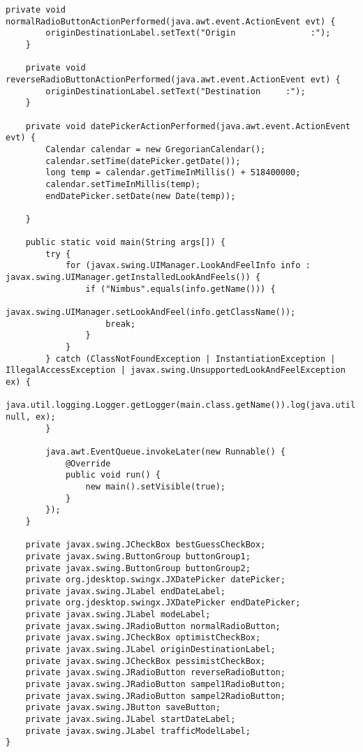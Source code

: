 \begin{lstlisting}[caption= main.java]
    private void normalRadioButtonActionPerformed(java.awt.event.ActionEvent evt) {                                                  
        originDestinationLabel.setText("Origin               :");
    }                                                 

    private void reverseRadioButtonActionPerformed(java.awt.event.ActionEvent evt) {                                                   
        originDestinationLabel.setText("Destination     :");
    }                                                  

    private void datePickerActionPerformed(java.awt.event.ActionEvent evt) {                                           
        Calendar calendar = new GregorianCalendar();
        calendar.setTime(datePicker.getDate());
        long temp = calendar.getTimeInMillis() + 518400000;
        calendar.setTimeInMillis(temp);
        endDatePicker.setDate(new Date(temp));
        
    }                                          

    public static void main(String args[]) {
        try {
            for (javax.swing.UIManager.LookAndFeelInfo info : javax.swing.UIManager.getInstalledLookAndFeels()) {
                if ("Nimbus".equals(info.getName())) {
                    javax.swing.UIManager.setLookAndFeel(info.getClassName());
                    break;
                }
            }
        } catch (ClassNotFoundException | InstantiationException | IllegalAccessException | javax.swing.UnsupportedLookAndFeelException ex) {
            java.util.logging.Logger.getLogger(main.class.getName()).log(java.util.logging.Level.SEVERE, null, ex);
        }
        
        java.awt.EventQueue.invokeLater(new Runnable() {
            @Override
            public void run() {
                new main().setVisible(true);
            }
        });
    }
                    
    private javax.swing.JCheckBox bestGuessCheckBox;
    private javax.swing.ButtonGroup buttonGroup1;
    private javax.swing.ButtonGroup buttonGroup2;
    private org.jdesktop.swingx.JXDatePicker datePicker;
    private javax.swing.JLabel endDateLabel;
    private org.jdesktop.swingx.JXDatePicker endDatePicker;
    private javax.swing.JLabel modeLabel;
    private javax.swing.JRadioButton normalRadioButton;
    private javax.swing.JCheckBox optimistCheckBox;
    private javax.swing.JLabel originDestinationLabel;
    private javax.swing.JCheckBox pessimistCheckBox;
    private javax.swing.JRadioButton reverseRadioButton;
    private javax.swing.JRadioButton sampel1RadioButton;
    private javax.swing.JRadioButton sampel2RadioButton;
    private javax.swing.JButton saveButton;
    private javax.swing.JLabel startDateLabel;
    private javax.swing.JLabel trafficModelLabel;            
}
\end{lstlisting}